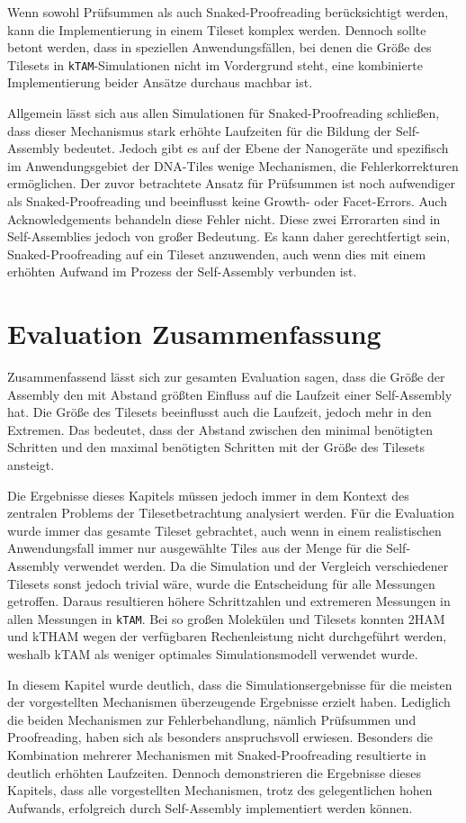 Wenn sowohl Prüfsummen als auch Snaked-Proofreading berücksichtigt werden, kann die Implementierung in einem Tileset komplex werden. Dennoch sollte betont werden, dass in speziellen Anwendungsfällen, bei denen die Größe des Tilesets in \texttt{kTAM}-Simulationen nicht im Vordergrund steht, eine kombinierte Implementierung beider Ansätze durchaus machbar ist.

Allgemein lässt sich aus allen Simulationen für Snaked-Proofreading schließen, dass dieser Mechanismus stark erhöhte Laufzeiten für die Bildung der Self-Assembly bedeutet. Jedoch gibt es auf der Ebene der Nanogeräte und spezifisch im Anwendungsgebiet der DNA-Tiles wenige Mechanismen, die Fehlerkorrekturen ermöglichen. Der zuvor betrachtete Ansatz für Prüfsummen ist noch aufwendiger als Snaked-Proofreading und beeinflusst keine Growth- oder Facet-Errors. Auch Acknowledgements behandeln diese Fehler nicht. Diese zwei Errorarten sind in Self-Assemblies jedoch von großer Bedeutung. Es kann daher gerechtfertigt sein, Snaked-Proofreading auf ein Tileset anzuwenden, auch wenn dies mit einem erhöhten Aufwand im Prozess der Self-Assembly verbunden ist.

\section{Evaluation Zusammenfassung}

Zusammenfassend lässt sich zur gesamten Evaluation sagen, dass die Größe der Assembly den mit Abstand größten Einfluss auf die Laufzeit einer Self-Assembly hat. Die Größe des Tilesets beeinflusst auch die Laufzeit, jedoch mehr in den Extremen. 
Das bedeutet, dass der Abstand zwischen den minimal benötigten Schritten und den maximal benötigten Schritten mit der Größe des Tilesets ansteigt.

Die Ergebnisse dieses Kapitels müssen jedoch immer in dem Kontext des zentralen Problems der Tilesetbetrachtung analysiert werden. Für die Evaluation wurde immer das gesamte Tileset gebrachtet, auch wenn in einem realistischen Anwendungsfall immer nur ausgewählte Tiles aus der Menge für die Self-Assembly verwendet werden. Da die Simulation und der Vergleich verschiedener Tilesets sonst jedoch trivial wäre, wurde die Entscheidung für alle Messungen getroffen. Daraus resultieren höhere Schrittzahlen und extremeren Messungen in allen Messungen in \texttt{kTAM}. Bei so großen Molekülen und Tilesets konnten 2HAM und kTHAM wegen der verfügbaren Rechenleistung nicht durchgeführt werden, weshalb kTAM als weniger optimales Simulationsmodell verwendet wurde. 

In diesem Kapitel wurde deutlich, dass die Simulationsergebnisse für die meisten der vorgestellten Mechanismen überzeugende Ergebnisse erzielt haben. Lediglich die beiden Mechanismen zur Fehlerbehandlung, nämlich Prüfsummen und Proofreading, haben sich als besonders anspruchsvoll erwiesen. Besonders die Kombination mehrerer Mechanismen mit Snaked-Proofreading resultierte in deutlich erhöhten Laufzeiten. Dennoch demonstrieren die Ergebnisse dieses Kapitels, dass alle vorgestellten Mechanismen, trotz des gelegentlichen hohen Aufwands, erfolgreich durch Self-Assembly implementiert werden können.
